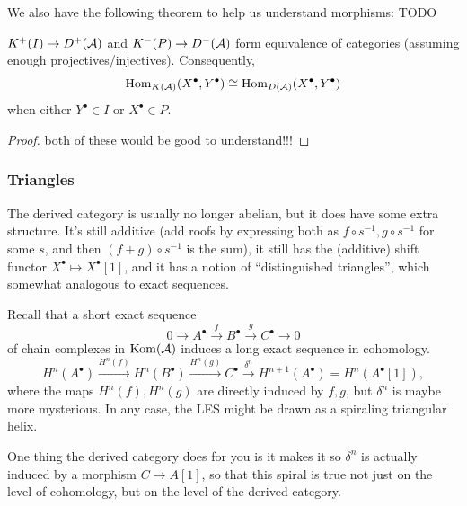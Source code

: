 \documentclass[12pt]{article}
\DeclareMathOperator{\Kom}{Kom}
\begin{document}
We also have the following theorem to help us understand morphisms: {\color{red} TODO}
\begin{prop}
    $K^+(I) \to D^+(\mathcal{A})$ and $K^-(P) \to D^-(\mathcal{A})$ form equivalence of categories (assuming enough projectives/injectives). Consequently,
    \[\mathrm{Hom}_{K(\mathcal{A})}(X^\bullet, Y^\bullet) \cong \mathrm{Hom}_{D(\mathcal{A})}(X^\bullet, Y^\bullet)\]
    when either $Y^\bullet \in I$ or $X^\bullet \in P$.
\end{prop}

\begin{proof}
    {\color{red} both of these would be good to understand!!!}
\end{proof}

\subsubsection{Triangles}

The derived category is usually no longer abelian, but it does have some extra structure. It's still additive (add roofs by expressing both as $f\circ s^{-1}, g\circ s^{-1}$ for some $s$, and then $(f+g)\circ s^{-1}$ is the sum), it still has the (additive) shift functor $X^\bullet \mapsto X^\bullet[1]$, and it has a notion of ``distinguished triangles'', which somewhat analogous to exact sequences.

Recall that a short exact sequence
\[0 \to A^\bullet \xrightarrow{f} B^\bullet \xrightarrow{g} C^\bullet \to 0 \tag{$*$}\]
of chain complexes in $\Kom(\cA)$ induces a long exact sequence in cohomology.
\[H^n(A^\bullet) \xrightarrow{H^n(f)} H^n(B^\bullet) \xrightarrow{H^n(g)} C^\bullet \xrightarrow{\delta^n} H^{n+1}(A^\bullet) = H^n(A^\bullet[1]),\]
where the maps $H^n(f), H^n(g)$ are directly induced by $f,g$, but $\delta^n$ is maybe more mysterious. In any case, the LES might be drawn as a spiraling triangular helix.
\begin{center}
\end{center}
One thing the derived category does for you is it makes it so $\delta^n$ is actually induced by a morphism $C\to A[1]$, so that this spiral is true not just on the level of cohomology, but on the level of the derived category.
\end{document}
